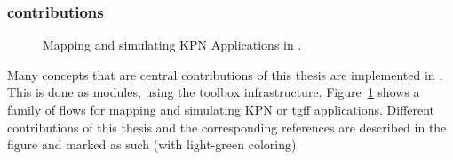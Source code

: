 \subsubsection{contributions}

\begin{figure}[h]
	\centering
   \resizebox{0.95\textwidth}{!}{}
	\caption{Mapping and simulating KPN Applications in \mocasin.}
	\label{fig:mocasin_kpn_simulation}
\end{figure}

Many concepts that are central contributions of this thesis are implemented in \mocasin. 
This is done as modules, using the \mocasin toolbox infrastructure. 
Figure~\ref{fig:mocasin_kpn_simulation} shows a family of \mocasin flows for mapping and simulating KPN or \ac{tgff} applications.
Different contributions of this thesis and the corresponding references are described in the figure and marked as such (with light-green coloring).
